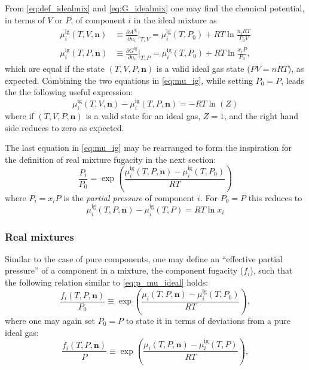 \documentclass[internal,english]{sintefmemo2012}
\newcommand{\pone}[3]{\frac{\partial #1}{\partial #2}\bigg|_{#3}}%
\newcommand*{\vektor}[1]{\boldsymbol{#1}}%
\begin{document}
From \eqref{eq:def_idealmix} and \eqref{eq:G_idealmix} 
one may find the chemical potential, in terms of $V$ or $P$, of component $i$ in the ideal mixture as
\begin{align}
  \mu_i^\text{ig}(T,V,\vektor{n}) &\equiv \pone{A^\text{ig}}{n_i}{T,V} = \mu_i^\text{ig}(T,P_0) + RT\ln \frac{n_i RT}{P_0 V} \nonumber \\
  \mu_i^\text{ig}(T,P,\vektor{n}) &\equiv \pone{G^\text{ig}}{n_i}{T,P} = \mu_i^\text{ig}(T,P_0) + RT\ln \frac{x_i P}{P_0},
  \label{eq:mu_ig}
\end{align}
which are equal if the state $(T,V,P,\vektor{n})$ is a valid ideal gas state ($PV=nRT$), as expected. Combining the two 
equations in \eqref{eq:mu_ig}, while setting $P_0=P$, leads the the following useful expression:
\begin{equation}
  \mu_i^\text{ig}(T,V,\vektor{n}) - \mu_i^\text{ig}(T,P,\vektor{n})
  =-RT\ln \left( Z \right)
  \label{eq:mu_ig_PVdiff}
\end{equation}
where if $(T,V,P,\vektor{n})$ is a valid state for an ideal gas, 
$Z=1$, and the right hand side reduces to zero as expected.

The last equation in \eqref{eq:mu_ig} may be rearranged to form the inspiration for the definition of 
real mixture fugacity in the next section:
\begin{equation}
  \frac{P_i}{P_0} = \exp\left( \frac{\mu^\text{ig}_i(T,P,\vektor{n}) - \mu^\text{ig}_i(T,P_0)}{RT} \right)
  \label{eq:p_mu_ideal}
\end{equation}
where $P_i=x_iP$ is the \textit{partial pressure} of component $i$. For $P_0 = P$ this reduces to 
\begin{equation}
  \mu^\text{ig}_i(T,P,\vektor{n}) - \mu^\text{ig}_i(T,P) = RT\ln x_i
  \label{eq:mu_and_xi_idealmix}
\end{equation}

\subsubsection{Real mixtures}
\label{sec:realmixtures}
Similar to the case of pure components, one may define an ``effective partial pressure'' of a component in a mixture, the 
component fugacity ($f_i$), such that the following relation similar to \eqref{eq:p_mu_ideal} holds:
\begin{equation}
  \frac{f_i(T,P,\vektor{n})}{P_0} \equiv \exp\left( \frac{\mu_i(T,P,\vektor{n}) - \mu_i^\text{ig}(T,P_0)}{RT} \right),
  \label{eq:fug_def_mix}
\end{equation}
where one may again set $P_0=P$ to state it in terms of deviations from a pure ideal gas:
\begin{equation}
  \frac{f_i(T,P,\vektor{n})}{P} \equiv \exp\left( \frac{\mu_i(T,P,\vektor{n}) - \mu_i^\text{ig}(T,P)}{RT} \right),
  \label{eq:fug_def_mix_P0eqP}
\end{equation}
\end{document}
